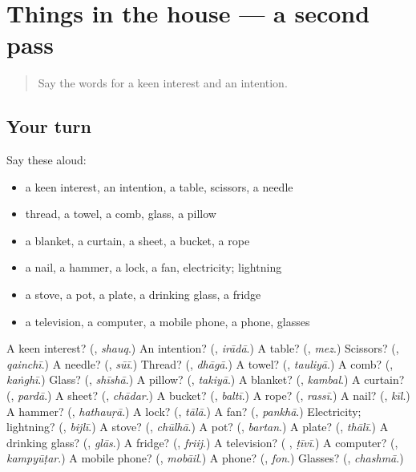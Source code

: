 \section[(dialogue)]{Things in the house — a second pass}

\label{lesson:UR-R110-second-pass-things-in-the-house}



\begin{quote}
Say the words for a keen interest and an intention.
\end{quote}

\subsection*{Your turn}
Say these aloud:

\begin{itemize}
\raggedright
  \item a keen interest, an intention, a table, scissors, a needle
  \item thread, a towel, a comb, glass, a pillow
  \item a blanket, a curtain, a sheet, a bucket, a rope
  \item a nail, a hammer, a lock, a fan, electricity; lightning
  \item a stove, a pot, a plate, a drinking glass, a fridge
  \item a television, a computer, a mobile phone, a phone, glasses
\end{itemize}

\begin{tcolorbox}[breakable,colback=teal!4,colframe=teal!35!black,title={Before you move on}]
A keen interest? (\textbf{}, \emph{shauq}.) An intention? (\textbf{}, \emph{irādā}.) A table? (\textbf{}, \emph{mez}.) Scissors? (\textbf{}, \emph{qainchī}.) A needle? (\textbf{}, \emph{sūī}.) Thread? (\textbf{}, \emph{dhāgā}.) A towel? (\textbf{}, \emph{tauliyā}.) A comb? (\textbf{}, \emph{kaṅghī}.) Glass? (\textbf{}, \emph{shīshā}.) A pillow? (\textbf{}, \emph{takiyā}.) A blanket? (\textbf{}, \emph{kambal}.) A curtain? (\textbf{}, \emph{pardā}.) A sheet? (\textbf{}, \emph{chādar}.) A bucket? (\textbf{}, \emph{baltī}.) A rope? (\textbf{}, \emph{rassī}.) A nail? (\textbf{}, \emph{kīl}.) A hammer? (\textbf{}, \emph{hathauṛā}.) A lock? (\textbf{}, \emph{tālā}.) A fan? (\textbf{}, \emph{pankhā}.) Electricity; lightning? (\textbf{}, \emph{bijlī}.) A stove? (\textbf{}, \emph{chūlhā}.) A pot? (\textbf{}, \emph{bartan}.) A plate? (\textbf{}, \emph{thālī}.) A drinking glass? (\textbf{}, \emph{glās}.) A fridge? (\textbf{}, \emph{friij}.) A television? (\textbf{ }, \emph{ṭīvī}.) A computer? (\textbf{}, \emph{kampyūṭar}.) A mobile phone? (\textbf{}, \emph{mobāil}.) A phone? (\textbf{}, \emph{fon}.) Glasses? (\textbf{}, \emph{chashmā}.)
\end{tcolorbox}
